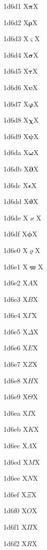 \documentclass[11pt]{article}
\begin{document}
1d6d1 X{\ensuremath{\mathbf{\pi}}}X

1d6d2 X{\ensuremath{\mathbf{\rho}}}X

1d6d3 X{\ensuremath{\mathbf{\varsigma}}}X

1d6d4 X{\ensuremath{\mathbf{\sigma}}}X

1d6d5 X{\ensuremath{\mathbf{\tau}}}X

1d6d6 X{\ensuremath{\mathbf{\upsilon}}}X

1d6d7 X{\ensuremath{\mathbf{\varphi}}}X

1d6d8 X{\ensuremath{\mathbf{\chi}}}X

1d6d9 X{\ensuremath{\mathbf{\psi}}}X

1d6da X{\ensuremath{\mathbf{\omega}}}X

1d6db X{\ensuremath{\mathbf{\partial}}}X

1d6dc X{\ensuremath{\mathbf{\epsilon}}}X

1d6dd X{\ensuremath{\mathbf{\vartheta}}}X

1d6de X{\ensuremath{\mathbf{\varkappa}}}X

1d6df X{\ensuremath{\mathbf{\phi}}}X

1d6e0 X{\ensuremath{\mathbf{\varrho}}}X

1d6e1 X{\ensuremath{\mathbf{\varpi}}}X

1d6e2 X{\ensuremath{\mathit{A}}}X

1d6e3 X{\ensuremath{\mathit{B}}}X

1d6e4 X{\ensuremath{\mathit{\Gamma}}}X

1d6e5 X{\ensuremath{\mathit{\Delta}}}X

1d6e6 X{\ensuremath{\mathit{E}}}X

1d6e7 X{\ensuremath{\mathit{Z}}}X

1d6e8 X{\ensuremath{\mathit{H}}}X

1d6e9 X{\ensuremath{\mathit{\Theta}}}X

1d6ea X{\ensuremath{\mathit{I}}}X

1d6eb X{\ensuremath{\mathit{K}}}X

1d6ec X{\ensuremath{\mathit{\Lambda}}}X

1d6ed X{\ensuremath{\mathit{M}}}X

1d6ee X{\ensuremath{\mathit{N}}}X

1d6ef X{\ensuremath{\mathit{\Xi}}}X

1d6f0 X{\ensuremath{\mathit{O}}}X

1d6f1 X{\ensuremath{\mathit{\Pi}}}X

1d6f2 X{\ensuremath{\mathit{R}}}X
\end{document}
